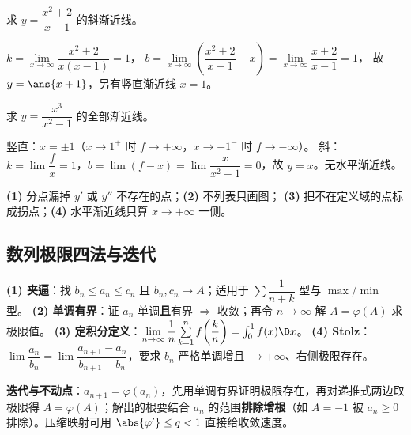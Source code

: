 \begin{exa}[斜渐近线的 $b$ 别漏]
求 $y=\dfrac{x^2+2}{x-1}$ 的斜渐近线。
\end{exa}
\begin{solution}
$k=\lim\limits_{x\to\infty}\dfrac{x^2+2}{x(x-1)}=1$，
$b=\lim\limits_{x\to\infty}\left(\dfrac{x^2+2}{x-1}-x\right)=\lim\limits_{x\to\infty}\dfrac{x+2}{x-1}=1$，
故 $y=\ans{x+1}$，另有竖直渐近线 $x=1$。
\end{solution}

\begin{exa}[分母两个零点的竖直渐近线]
求 $y=\dfrac{x^3}{x^2-1}$ 的全部渐近线。
\end{exa}
\begin{solution}
竖直：$x=\pm1$（$x\to1^+$ 时 $f\to+\infty$，$x\to-1^-$ 时 $f\to-\infty$）。
斜：$k=\lim\dfrac{f}{x}=1$，$b=\lim(f-x)=\lim\dfrac{x}{x^2-1}=0$，故 $y=x$。无水平渐近线。
\end{solution}

\begin{warnbox}[作图题十二条里最致命的四条]
\textbf{(1)} 分点漏掉 $y'$ 或 $y''$ 不存在的点；\textbf{(2)} 不列表只画图；
\textbf{(3)} 把不在定义域的点标成拐点；\textbf{(4)} 水平渐近线只算 $x\to+\infty$ 一侧。
\end{warnbox}

\subsection{数列极限四法与迭代}

\begin{keypoint}[四种武器]
\textbf{(1) 夹逼}：找 $b_n\le a_n\le c_n$ 且 $b_n,c_n\to A$；适用于 $\sum\dfrac{1}{n+k}$ 型与 $\max$/$\min$ 型。
\textbf{(2) 单调有界}：证 $a_n$ 单调\textbf{且}有界 $\Rightarrow$ 收敛；再令 $n\to\infty$ 解 $A=\varphi(A)$ 求极限值。
\textbf{(3) 定积分定义}：$\lim\limits_{n\to\infty}\dfrac1n\sum\limits_{k=1}^n f\!\left(\dfrac kn\right)=\int_0^1 f(x)\D x$。
\textbf{(4) Stolz}：$\lim\dfrac{a_n}{b_n}=\lim\dfrac{a_{n+1}-a_n}{b_{n+1}-b_n}$，要求 $b_n$ 严格单调增且 $\to+\infty$、右侧极限存在。
\end{keypoint}

\noindent\textbf{迭代与不动点}：$a_{n+1}=\varphi(a_n)$，先用单调有界证明极限存在，再对递推式两边取极限得 $A=\varphi(A)$；解出的根要结合 $a_n$ 的范围\textbf{排除增根}（如 $A=-1$ 被 $a_n\ge0$ 排除）。压缩映射可用 $\abs{\varphi'}\le q<1$ 直接给收敛速度。


